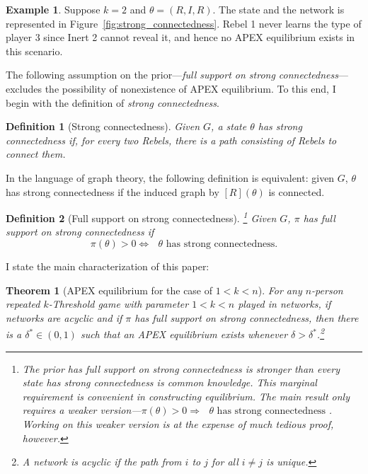 \documentclass[12pt,letter]{article}
\newtheorem{theorem}{Theorem}
\newtheorem{definition}{Definition}[section]
\theoremstyle{definition}
\newtheorem{example}{Example}
\theoremstyle{definition}
\theoremstyle{remark}
\theoremstyle{claim}
\begin{document}
\begin{example}\label{ex_strong_connectedness}
Suppose $k=2$ and $\theta=(R,I,R)$. The state and the network is represented in Figure~\ref{fig:strong_connectedness}. Rebel 1 never learns the type of player 3 since Inert 2 cannot reveal it, and hence no APEX equilibrium exists in this scenario.
\end{example}

The following assumption on the prior---\textit{full support on strong connectedness}---excludes the possibility of nonexistence of APEX equilibrium. To this end, I begin with the definition of \textit{strong connectedness}.

\begin{definition}[Strong connectedness]
\label{def:strong_connectedness}
Given $G$, a state $\theta$ has strong connectedness if, for every two Rebels, there is a path consisting of Rebels to connect them.

\end{definition}  

In the language of graph theory, the following definition is equivalent: given $G$, $\theta$ has strong connectedness if the induced graph by $[R](\theta)$ is connected.

\begin{definition}[Full support on strong connectedness]\footnote{The prior has full support on strong connectedness is stronger than every state has strong connectedness is common knowledge. This marginal requirement is convenient in constructing equilibrium. The main result only requires a weaker version---$\pi(\theta)>0\Rightarrow \text{ $\theta$ has strong connectedness }$. Working on this weaker version is at the expense of much tedious proof, however.}
Given $G$, $\pi$ has full support on strong connectedness if 
\[\pi(\theta)>0\Leftrightarrow \text{ $\theta$ has strong connectedness}.\]
\end{definition}  

I state the main characterization of this paper:
\begin{theorem}[APEX equilibrium for the case of $1<k<n$]
\label{thm_main_result}
For any $n$-person repeated $k$-Threshold game with parameter $1<k<n$ played in networks, if networks are acyclic and if $\pi$ has full support on strong connectedness, then there is a $\delta^{*}\in(0,1)$ such that an APEX equilibrium exists whenever $\delta>\delta^{*}$.\footnote{A network is acyclic if the path from $i$ to $j$ for all $i\neq j$ is unique.}

\end{theorem}
\end{document}

